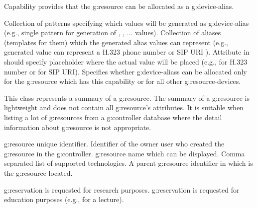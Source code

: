 \begin{Api}
 Capability provides that the \gls{g:resource} can be allocated as a \gls{g:device-alias}.
\begin{ApiClassAttributes}
 Collection of patterns specifying which values will be generated as \gls{g:device-alias} (e.g., single  pattern for generation of , , ...  values). 
 Collection of aliases (templates for them) which the generated alias values can represent (e.g., generated value  can represent a H.323 phone number  or SIP URI ). Attribute  in  should specify  placeholder where the actual value will be placed (e.g.,  for H.323 number or  for SIP URI).
 Specifies whether \glspl{g:device-alias} can be allocated only for the \gls{g:resource} which has this capability or for all other \glspl{g:resource-device}.
\end{ApiClassAttributes}

This class represents a summary of a \gls{g:resource}. The summary of a \gls{g:resource} is lightweight and does not contain all \gls{g:resource}'s attributes. It is suitable when listing a lot of \glspl{g:resource} from a \gls{g:controller} database where the detail information about \gls{g:resource} is not appropriate.
\begin{ApiClassAttributes}
 \Gls{g:resource} unique identifier.
 Identifier of the owner user who created the \gls{g:resource} in the \gls{g:controller}.
 \Gls{g:resource} name which can be displayed.
 Comma separated list of supported technologies.
 A parent \gls{g:resource} identifier in which is the \gls{g:resource} located.
\end{ApiClassAttributes}

\begin{ApiEnumValues}
 \Gls{g:reservation} is requested for research purposes.
 \Gls{g:reservation} is requested for education purposes (e.g., for a lecture).
\end{ApiEnumValues}


\end{Api}
